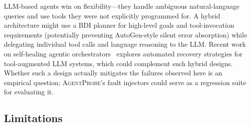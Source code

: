 \documentclass[make,article,submit,moreauthors,pdftex]{mdpi}
\providecommand{\agentprobe}{\textsc{AgentProbe}}
\begin{document}
LLM-based agents win on flexibility---they handle ambiguous natural-language queries and use tools they were not explicitly programmed for. A hybrid architecture might use a BDI planner for high-level goals and tool-invocation requirements (potentially preventing AutoGen-style silent error absorption) while delegating individual tool calls and language reasoning to the LLM. Recent work on self-healing agentic orchestrators~\cite{sureshbabu2026selfhealing} explores automated recovery strategies for tool-augmented LLM systems, which could complement such hybrid designs. Whether such a design actually mitigates the failures observed here is an empirical question; \agentprobe{}'s fault injectors could serve as a regression suite for evaluating it.

\subsection{Limitations}\label{sec:limitations}
\end{document}
